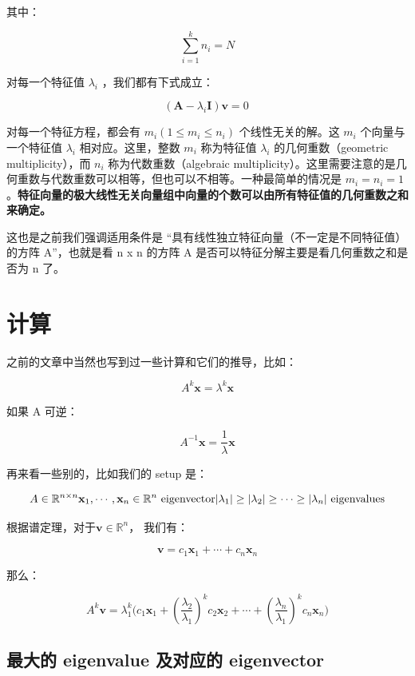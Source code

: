 \documentclass[
]{book}
\begin{document}
其中：

\[\sum\limits_{i=1}^{k}{n_i} =N\]

对每一个特征值 \(\lambda_i\) ，我们都有下式成立：

\[ \left(\mathbf{A} - \lambda_i \mathbf{I}\right)\mathbf{v}  = 0 \!\ \]

对每一个特征方程，都会有 \(m_i ( 1 \le m_i \le n_i)\) 个线性无关的解。这 \(m_i\) 个向量与一个特征值 \(\lambda_i\) 相对应。这里，整数 \(m_i\) 称为特征值 \(\lambda_i\) 的几何重数（geometric multiplicity），而 \(n_i\) 称为代数重数（algebraic multiplicity）。这里需要注意的是几何重数与代数重数可以相等，但也可以不相等。一种最简单的情况是 \(m_i = n_i = 1\)。\textbf{特征向量的极大线性无关向量组中向量的个数可以由所有特征值的几何重数之和来确定。}

这也是之前我们强调适用条件是 ``具有线性独立特征向量（不一定是不同特征值）的方阵 A''，也就是看 n x n 的方阵 A 是否可以特征分解主要是看几何重数之和是否为 n 了。

\hypertarget{ux8ba1ux7b97-3}{%
\section{计算}\label{ux8ba1ux7b97-3}}

之前的文章中当然也写到过一些计算和它们的推导，比如：

\[A^k\mathbf{x} = \lambda^k\mathbf{x}\]

如果 A 可逆：

\[A^{-1}\mathbf{x} =\frac{1}{\lambda} \mathbf{x}\]

再来看一些别的，比如我们的 setup 是：

\[ A \in \mathbb{R} ^{n \times n} \\
\mathbf{x}_1, \cdots, \mathbf{x}_n \in \mathbb{R}^n  \text{ eigenvector}  \\
|\lambda_1| \ge |\lambda_2| \ge \cdots \ge |\lambda_n| \text{ eigenvalues}
\]

根据谱定理，对于\(\mathbf{v} \in \mathbb{R}^n\)， 我们有：

\[\mathbf{v} = c_1 \mathbf{x}_1 + \cdots + c_n\mathbf{x}_n\]

那么：

\[A^k\mathbf{v} = \lambda_1^k \bigg( c_1 \mathbf{x}_1 +  (\frac{\lambda_2}{\lambda_1})^k c_2 \mathbf{x}_2 + \cdots + (\frac{\lambda_n}{\lambda_1})^k  c_n\mathbf{x}_n \bigg)\]

\hypertarget{ux6700ux5927ux7684-eigenvalue-ux53caux5bf9ux5e94ux7684-eigenvector}{%
\subsection{最大的 eigenvalue 及对应的 eigenvector}\label{ux6700ux5927ux7684-eigenvalue-ux53caux5bf9ux5e94ux7684-eigenvector}}
\end{document}
